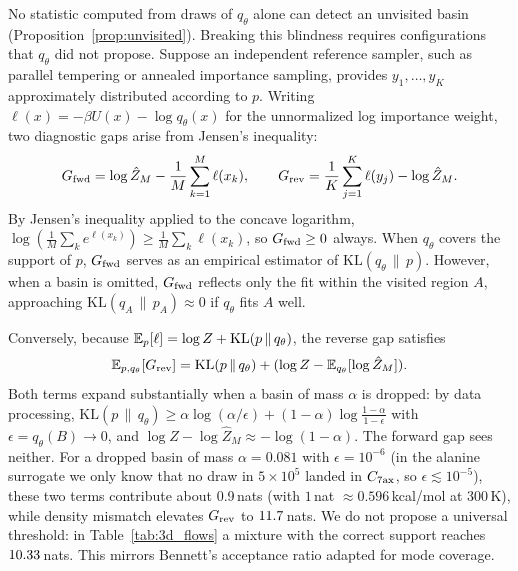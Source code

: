 No statistic computed from draws of $q_\theta$ alone can detect an unvisited basin (Proposition~\ref{prop:unvisited}). Breaking this blindness requires configurations that $q_\theta$ did not propose. Suppose an independent reference sampler, such as parallel tempering or annealed importance sampling, provides $y_1,\dots,y_K$ approximately distributed according to $p$. Writing $\ell(x)=-\beta U(x)-\log q_\theta(x)$ for the unnormalized log importance weight, two diagnostic gaps arise from Jensen's inequality:
\begin{equation}
G_{\rm fwd}=\log\hat Z_M-\frac1M\sum_{k=1}^M\ell(x_k),\qquad
G_{\rm rev}=\frac1K\sum_{j=1}^K\ell(y_j)-\log\hat Z_M.
\end{equation}
By Jensen's inequality applied to the concave logarithm, $\log(\frac1M\sum_k e^{\ell(x_k)})\ge\frac1M\sum_k\ell(x_k)$, so $G_{\rm fwd}\ge0$ always. When $q_\theta$ covers the support of $p$, $G_{\rm fwd}$ serves as an empirical estimator of $\mathrm{KL}(q_\theta\,\|\,p)$. However, when a basin is omitted, $G_{\rm fwd}$ reflects only the fit within the visited region $A$, approaching $\mathrm{KL}(q_A\,\|\,p_A)\approx0$ if $q_\theta$ fits $A$ well.

Conversely, because $\mathbb{E}_p[\ell]=\log Z+\mathrm{KL}(p\,\|\,q_\theta)$, the reverse gap satisfies
\begin{equation}
\mathbb{E}_{p, q_\theta}[G_{\rm rev}] = \mathrm{KL}(p\,\|\,q_\theta) + (\log Z - \mathbb{E}_{q_\theta}[\log\hat Z_M]).
\end{equation}
Both terms expand substantially when a basin of mass $\alpha$ is dropped: by data processing, $\mathrm{KL}(p\,\|\,q_\theta)\ge\alpha\log(\alpha/\epsilon)+(1-\alpha)\log\frac{1-\alpha}{1-\epsilon}$ with $\epsilon=q_\theta(B)\to0$, and $\log Z-\log\hat Z_M\approx-\log(1-\alpha)$. The forward gap sees neither. For a dropped basin of mass $\alpha=0.081$ with $\epsilon=10^{-6}$ (in the alanine surrogate we only know that no draw in $5\times10^5$ landed in $C_{7\rm ax}$, so $\epsilon\lesssim10^{-5}$), these two terms contribute about 0.9\,nats (with $1$\,nat $\approx 0.596$\,kcal/mol at 300\,K), while density mismatch elevates $G_{\rm rev}$ to $11.7$\,nats. We do not propose a universal threshold: in Table~\ref{tab:3d_flows} a mixture with the correct support reaches $10.33$\,nats. This mirrors Bennett's acceptance ratio \citep{bennett1976bar} adapted for mode coverage.

